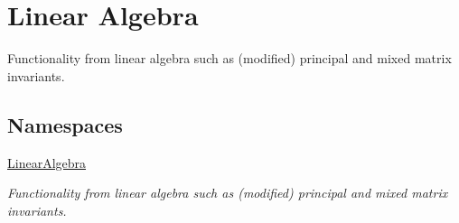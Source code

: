 \hypertarget{group__LinearAlgebraGroup}{\section{Linear Algebra}
\label{group__LinearAlgebraGroup}
}


Functionality from linear algebra such as (modified) principal and mixed matrix invariants.  


\subsection*{Namespaces}
\begin{DoxyCompactItemize}
\item 
\hyperlink{namespaceLinearAlgebra}{Linear\-Algebra}
\begin{DoxyCompactList}\small\item\em Functionality from linear algebra such as (modified) principal and mixed matrix invariants. \end{DoxyCompactList}\end{DoxyCompactItemize}
